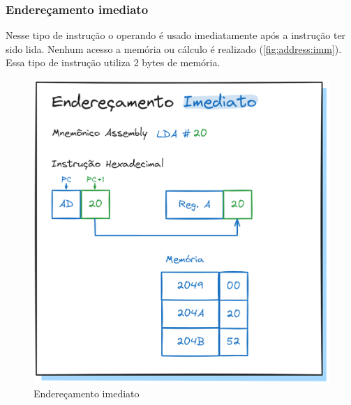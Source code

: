 \documentclass[
	12pt,				  %
	openright,		%
	a4paper,			%
	english,			%
	french,				%
	spanish,			%
	brazil,				%
]{abntex2}
\begin{document}
\subsubsection{Endereçamento imediato}
Nesse tipo de instrução o operando é usado imediatamente após a instrução ter
sido lida. Nenhum acesso a memória ou cálculo é realizado
(\autoref{fig:address:imm}). Essa tipo de instrução utiliza 2 bytes de memória.

\begin{figure}[h]
	\centering
	\caption{Endereçamento imediato} \label{fig:address:imm}
	\includegraphics[scale=0.25]{../assets/img/addressing-modes-imm.png}
\end{figure}
\end{document}
